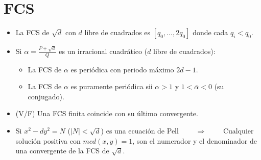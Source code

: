 \documentclass[fleqn]{article}
\def\next{\qquad \Rightarrow \qquad}
\begin{document}
    \section{FCS}
    \begin{itemize}
        \item La FCS de $\sqrt{d}$ con $d$ libre de cuadrados es $[q_0, \dots, 2q_0]$ donde cada $q_i < q_0$.
        \item Si $\alpha = \frac{P + \sqrt{d}}{Q}$ es un irracional cuadrático ($d$ libre de cuadrados): 
                \begin{itemize}
                    \item La FCS de $\alpha$ es periódica con periodo máximo $2d - 1$.
                    \item La FCS de $\alpha$ es puramente periódica sii $\alpha > 1$ y $1 < \overline{\alpha} < 0$ (su conjugado).
                \end{itemize}
        \item (V/F) Una FCS finita coincide con su último convergente.
        \item Si $x^2 - dy^2 = N$ ($|N| < \sqrt{d}$) es una ecuación de Pell $\next$ Cualquier solución positiva con $mcd(x,y) = 1$, son el numerador y el denominador de una convergente de la FCS de $\sqrt{d}$.
    \end{itemize}
\end{document}
